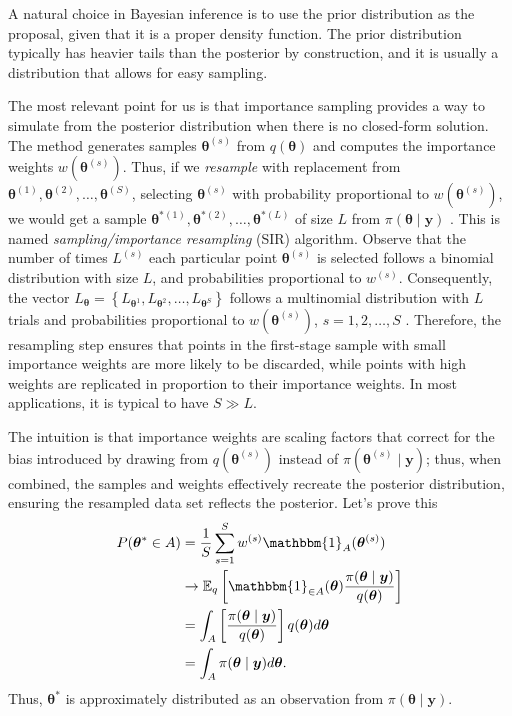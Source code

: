 A natural choice in Bayesian inference is to use the prior distribution as the proposal, given that it is a proper density function. The prior distribution typically has heavier tails than the posterior by construction, and it is usually a distribution that allows for easy sampling.

The most relevant point for us is that importance sampling provides a way to simulate from the posterior distribution when there is no closed-form solution. The method generates samples $\bm{\theta}^{(s)}$ from $q(\bm{\theta})$ and computes the importance weights $w(\bm{\theta}^{(s)})$. Thus, if we \textit{resample} with replacement from $\bm{\theta}^{(1)},\bm{\theta}^{(2)},\dots,\bm{\theta}^{(S)}$, selecting $\bm{\theta}^{(s)}$ with probability proportional to  $w(\bm{\theta}^{(s)})$, we would get a sample $\bm{\theta}^{*(1)},\bm{\theta}^{*(2)},\dots,\bm{\theta}^{*(L)}$ of size $L$ from $\pi(\bm{\theta}\mid \bm{y})$ \cite{smith1992bayesian,rubin1988sir}. This is named \textit{sampling/importance resampling} (SIR) algorithm. Observe that the number of times $L^{(s)}$ each particular point $\bm{\theta}^{(s)}$ is selected follows a binomial distribution with size $L$, and probabilities proportional to $w^{(s)}$. Consequently, the vector $L_{\bm{\theta}} = \left\{L_{\bm{\theta}^1}, L_{\bm{\theta}^2}, \dots, L_{\bm{\theta}^S}\right\}$ follows a multinomial distribution with $L$ trials and probabilities proportional to $w(\bm{\theta}^{(s)})$, $s = 1, 2, \dots, S$ \cite{cappe2007overview}. Therefore, the resampling step ensures that points in the first-stage sample with small importance weights are more likely to be discarded, while points with high weights are replicated in proportion to their importance weights. In most applications, it is typical to have $S \gg L$.

The intuition is that importance weights are scaling factors that correct for the bias introduced by drawing from $q(\bm{\theta}^{(s)})$ instead of $\pi(\bm{\theta}^{(s)}\mid \bm{y})$; thus, when combined, the samples and weights effectively recreate the posterior distribution, ensuring the resampled data set reflects the posterior. Let's prove this 
\begin{align*}
	P(\bm{\theta}^*\in A)
	&=\frac{1}{S}\sum_{s=1}^S{w}^{(s)}\mathbbm{1}_{A}(\bm{\theta}^{(s)})\\
	&\rightarrow \mathbb{E}_q\left[\mathbbm{1}_{\in A}(\bm{\theta})\frac{\pi(\bm{\theta}\mid \bm{y})}{q(\bm{\theta})}\right]\\
	&=\int_{A}\left[\frac{\pi(\bm{\theta}\mid \bm{y})}{q(\bm{\theta})}\right]q(\bm{\theta})d\bm{\theta}\\
	&=\int_{A}\pi(\bm{\theta}\mid \bm{y})d\bm{\theta}. 
\end{align*}
Thus, $\bm{\theta}^*$ is approximately distributed as an observation from $\pi(\bm{\theta}\mid \bm{y})$.   


